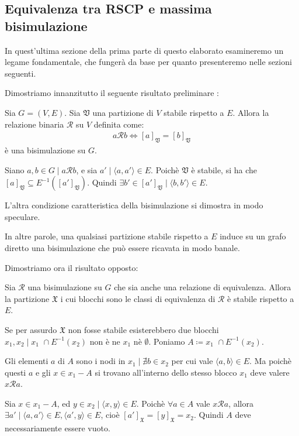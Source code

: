\subsection{Equivalenza tra RSCP e massima bisimulazione}
\label{sec:bisi_and_rscp}
In quest'ultima sezione della prima parte di questo elaborato esamineremo un legame fondamentale, che fungerà da base per quanto presenteremo nelle sezioni seguenti.

Dimostriamo innanzitutto il seguente risultato preliminare \cite{gentilini}:
\begin{proposition}
    Sia $G = (V,E)$. Sia $\mathfrak{V}$ una partizione di $V$ stabile rispetto a $E$. Allora la relazione binaria $\mathcal{R}$ su $V$ definita come:
    \begin{gather*}
        a \mathcal{R} b \iff [a]_\mathfrak{V} = [b]_\mathfrak{V}
    \end{gather*}
    è una bisimulazione su $G$.
    \label{prop:part_induce_bisi}
\end{proposition}
\begin{proof2}
    Siano $a,b \in G \mid a \mathcal{R} b$, e sia $a' \mid \langle a, a' \rangle \in E$. Poichè $\mathfrak{V}$ è stabile, si ha che $[a]_\mathfrak{V} \subseteq E^{-1}([a']_\mathfrak{V})$. Quindi $\exists b' \in [a']_\mathfrak{V} \mid \langle b, b' \rangle \in E$.

    L'altra condizione caratteristica della bisimulazione si dimostra in modo speculare.
\end{proof2}
In altre parole, una qualsiasi partizione stabile rispetto a $E$ induce su un grafo diretto una bisimulazione che può essere ricavata in modo banale.

Dimostriamo ora il risultato opposto:
\begin{proposition}
    Sia $\mathcal{R}$ una bisimulazione su $G$ che sia anche una relazione di equivalenza. Allora la partizione $\mathfrak{X}$ i cui blocchi sono le classi di equivalenza di $\mathcal{R}$ è stabile rispetto a $E$.
    \label{prop:bisi_induce_part}
\end{proposition}
\begin{proof2}
    Se per assurdo $\mathfrak{X}$ non fosse stabile esisterebbero due blocchi $x_1, x_2 \mid x_1 \,\,\cap E^{-1}(x_2)$ non è ne $x_1$ nè $\emptyset$. Poniamo $A \coloneqq x_1 \,\,\cap E^{-1}(x_2)$.

    Gli elementi $a$ di $A$ sono i nodi in $x_1 \mid \nexists b \in x_2$ per cui vale $\langle a, b \rangle \in E$. Ma poichè questi $a$ e gli $x \in x_1 - A$ si trovano all'interno dello stesso blocco $x_1$ deve valere $x \mathcal{R} a$.

    Sia $x \in x_1 - A$, ed $y \in x_2 \mid \langle x, y \rangle \in E$. Poichè $\forall a \in A$ vale $x \mathcal{R} a$, allora $\exists a' \mid \langle a, a' \rangle \in E, \langle a', y \rangle \in E$, cioè $[a']_\mathfrak{X} = [y]_\mathfrak{X} = x_2$. Quindi $A$ deve necessariamente essere vuoto.
\end{proof2}

